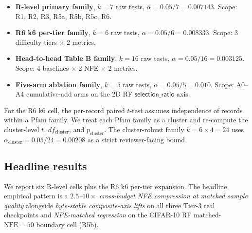 \documentclass[journal,twocolumn,final]{IEEEtran}
\newcommand{\NFE}{\mathrm{NFE}}
\begin{document}
\begin{itemize}
\item \textbf{R-level primary family}, $k = 7$ raw tests, $\alpha = 0.05/7 =
0.007143$. Scope: R1, R2, R3, R5a, R5b, R5c, R6.
\item \textbf{R6 k6 per-tier family}, $k = 6$ raw tests, $\alpha = 0.05/6 =
0.008333$. Scope: 3 difficulty tiers $\times$ 2 metrics.
\item \textbf{Head-to-head Table B family}, $k = 16$ raw tests, $\alpha =
0.05/16 = 0.003125$. Scope: 4 baselines $\times$ 2 NFE $\times$ 2 metrics.
\item \textbf{Five-arm ablation family}, $k = 5$ raw tests, $\alpha = 0.05/5
= 0.010$. Scope: A0--A4 cumulative-add arms on the 2D RF
$\mathsf{selection\_ratio}$ axis.
\end{itemize}

For the R6 k6 cell, the per-record paired $t$-test assumes independence of
records within a Pfam family. We treat each Pfam family as a cluster and
re-compute the cluster-level $t$, $df_\mathrm{cluster}$, and
$p_\mathrm{cluster}$. The cluster-robust family $k = 6 \times 4 = 24$ uses
$\alpha_\mathrm{cluster} = 0.05/24 = 0.00208$ as a strict reviewer-facing
bound.

\subsection{Headline results}

We report six R-level cells plus the R6 k6 per-tier expansion. The headline
empirical pattern is a \emph{$2.5$--$10\times$ cross-budget NFE compression at
matched sample quality} alongside \emph{byte-stable composite-axis lifts} on
all three Tier-3 real checkpoints and \emph{NFE-matched regression} on the
CIFAR-10 RF matched-$\NFE = 50$ boundary cell (R5b).
\end{document}

